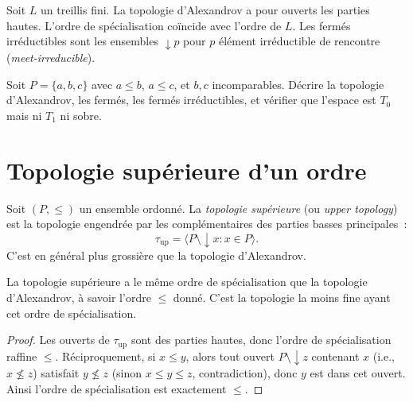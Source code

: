 \begin{exemple}
Soit $L$ un treillis fini. La topologie d'Alexandrov a pour ouverts les parties hautes.
L'ordre de sp\'ecialisation co\"incide avec l'ordre de $L$. Les ferm\'es irr\'eductibles
sont les ensembles $\downarrow\! p$ pour $p$ \'el\'ement irr\'eductible de rencontre
(\emph{meet-irreducible}).
\end{exemple}

\begin{exercice}
Soit $P = \{a,b,c\}$ avec $a \leq b$, $a \leq c$, et $b,c$ incomparables. D\'ecrire
la topologie d'Alexandrov, les ferm\'es, les ferm\'es irr\'eductibles, et v\'erifier que
l'espace est $T_0$ mais ni $T_1$ ni sobre.
\end{exercice}

\section{Topologie sup\'erieure d'un ordre}

\begin{definition}
Soit $(P, \leq)$ un ensemble ordonn\'e. La \emph{topologie sup\'erieure} (ou \emph{upper
topology}) est la topologie engendr\'ee par les compl\'ementaires des parties basses
principales~:
\[
  \tau_{\mathrm{up}} = \langle P \setminus \downarrow\! x : x \in P \rangle.
\]
C'est en g\'en\'eral plus grossi\`ere que la topologie d'Alexandrov.
\end{definition}

\begin{proposition}
La topologie sup\'erieure a le m\^eme ordre de sp\'ecialisation que la topologie
d'Alexandrov, \`a savoir l'ordre $\leq$ donn\'e. C'est la topologie la moins fine ayant
cet ordre de sp\'ecialisation.
\end{proposition}

\begin{proof}
Les ouverts de $\tau_{\mathrm{up}}$ sont des parties hautes, donc l'ordre de
sp\'ecialisation raffine $\leq$. R\'eciproquement, si $x \leq y$, alors tout
ouvert $P \setminus \downarrow\! z$ contenant $x$ (i.e., $x \not\leq z$) satisfait
$y \not\leq z$ (sinon $x \leq y \leq z$, contradiction), donc $y$ est dans cet ouvert.
Ainsi l'ordre de sp\'ecialisation est exactement $\leq$.
\end{proof}

